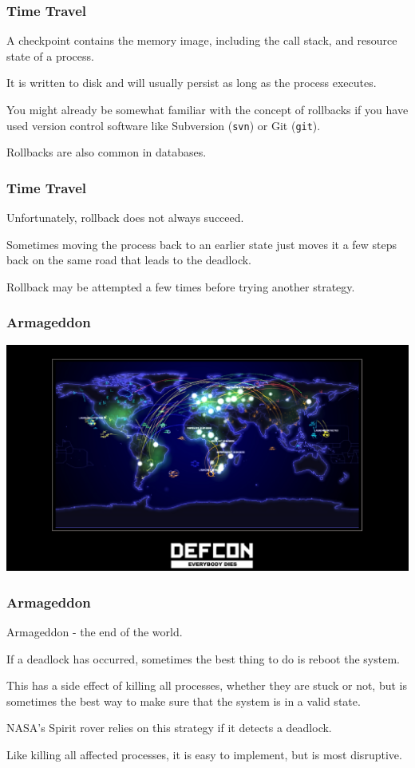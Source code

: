 \begin{frame}
	\frametitle{Time Travel}

	A checkpoint contains the memory image, including the call stack, and resource state of a process.

	It is written to disk and will usually persist as long as the process executes.

	You might already be somewhat familiar with the concept of rollbacks if you have used version control software like Subversion (\texttt{svn}) or Git (\texttt{git}).

	Rollbacks are also common in databases.

\end{frame}

\begin{frame}
	\frametitle{Time Travel}

	Unfortunately, rollback does not always succeed.

	Sometimes moving the process back to an earlier state just moves it a few steps back on the same road that leads to the deadlock.

	Rollback may be attempted a few times before trying another strategy.

\end{frame}


\begin{frame}
	\frametitle{Armageddon}

	\begin{center}
		\includegraphics[width=\textwidth]{images/defcon.jpg}
	\end{center}

\end{frame}


\begin{frame}
	\frametitle{Armageddon}

	Armageddon - the end of the world.

	If a deadlock has occurred, sometimes the best thing to do is reboot the system.

	This has a side effect of killing all processes, whether they are stuck or not, but is sometimes the best way to make sure that the system is in a valid state.

	NASA's Spirit rover relies on this strategy if it detects a deadlock.

	Like killing all affected processes, it is easy to implement, but is most disruptive.

\end{frame}

